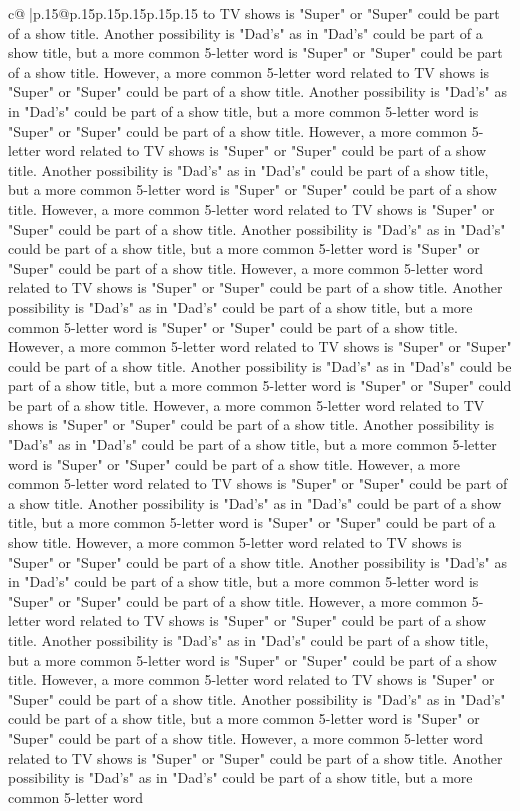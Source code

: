 \documentclass{article}
\begin{document}
{\begin{supertabular}{c@{$\;$}|p{.15\linewidth}@{}p{.15\linewidth}p{.15\linewidth}p{.15\linewidth}p{.15\linewidth}p{.15\linewidth}}
{{{to TV shows is "Super" or "Super" could be part of a show title. Another possibility is "Dad's" as in "Dad's" could be part of a show title, but a more common 5{-}letter word is "Super" or "Super" could be part of a show title. However, a more common 5{-}letter word related to TV shows is "Super" or "Super" could be part of a show title. Another possibility is "Dad's" as in "Dad's" could be part of a show title, but a more common 5{-}letter word is "Super" or "Super" could be part of a show title. However, a more common 5{-}letter word related to TV shows is "Super" or "Super" could be part of a show title. Another possibility is "Dad's" as in "Dad's" could be part of a show title, but a more common 5{-}letter word is "Super" or "Super" could be part of a show title. However, a more common 5{-}letter word related to TV shows is "Super" or "Super" could be part of a show title. Another possibility is "Dad's" as in "Dad's" could be part of a show title, but a more common 5{-}letter word is "Super" or "Super" could be part of a show title. However, a more common 5{-}letter word related to TV shows is "Super" or "Super" could be part of a show title. Another possibility is "Dad's" as in "Dad's" could be part of a show title, but a more common 5{-}letter word is "Super" or "Super" could be part of a show title. However, a more common 5{-}letter word related to TV shows is "Super" or "Super" could be part of a show title. Another possibility is "Dad's" as in "Dad's" could be part of a show title, but a more common 5{-}letter word is "Super" or "Super" could be part of a show title. However, a more common 5{-}letter word related to TV shows is "Super" or "Super" could be part of a show title. Another possibility is "Dad's" as in "Dad's" could be part of a show title, but a more common 5{-}letter word is "Super" or "Super" could be part of a show title. However, a more common 5{-}letter word related to TV shows is "Super" or "Super" could be part of a show title. Another possibility is "Dad's" as in "Dad's" could be part of a show title, but a more common 5{-}letter word is "Super" or "Super" could be part of a show title. However, a more common 5{-}letter word related to TV shows is "Super" or "Super" could be part of a show title. Another possibility is "Dad's" as in "Dad's" could be part of a show title, but a more common 5{-}letter word is "Super" or "Super" could be part of a show title. However, a more common 5{-}letter word related to TV shows is "Super" or "Super" could be part of a show title. Another possibility is "Dad's" as in "Dad's" could be part of a show title, but a more common 5{-}letter word is "Super" or "Super" could be part of a show title. However, a more common 5{-}letter word related to TV shows is "Super" or "Super" could be part of a show title. Another possibility is "Dad's" as in "Dad's" could be part of a show title, but a more common 5{-}letter word is "Super" or "Super" could be part of a show title. However, a more common 5{-}letter word related to TV shows is "Super" or "Super" could be part of a show title. Another possibility is "Dad's" as in "Dad's" could be part of a show title, but a more common 5{-}letter word }}}
\end{supertabular}}
\end{document}
